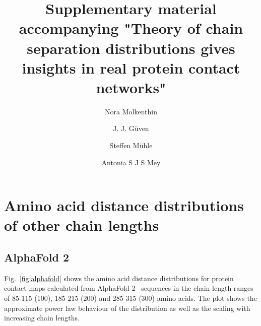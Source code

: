 \documentclass[notitlepage,
reprint,%
onecolumn,
amsmath,amssymb,superscriptaddress,aps,
pre,floatfix]{revtex4-1}
\begin{document}
\title{Supplementary material accompanying "Theory of chain separation distributions gives insights in real protein contact networks"}
\author{Nora Molkenthin}
\author{J. J.  Güven}
\author{Steffen Mühle}
\author{Antonia S J S Mey}
\maketitle

\section*{Amino acid distance distributions of other chain lengths}
\subsection{AlphaFold 2}
Fig.~\ref{fig:alphafold} shows the amino acid distance distributions for protein contact maps calculated from AlphaFold 2~\cite{jumper2021highly} sequences in the chain length ranges of 85-115 (100), 185-215 (200) and 285-315 (300) amino acids. The plot shows the approximate power law behaviour of the distribution as well as the scaling with increasing chain lengths. 
\end{document}
